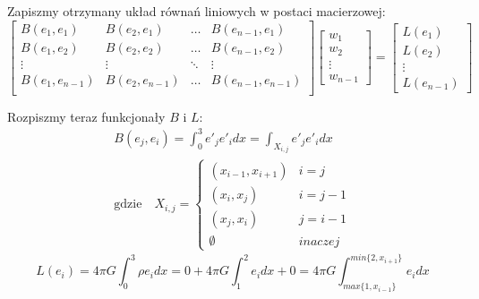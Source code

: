 \documentclass[11pt,a4paper]{article}
\begin{document}
Zapiszmy otrzymany układ równań liniowych w postaci macierzowej:
\begin{equation}
    \begin{bmatrix}
        B(e_1, e_1) & B(e_2, e_1) & \dots & B(e_{n - 1}, e_1) \\
        B(e_1, e_2) & B(e_2, e_2) & \dots & B(e_{n - 1}, e_2) \\
        \vdots & \vdots & \ddots & \vdots \\
        B(e_1, e_{n - 1}) & B(e_2, e_{n - 1}) & \dots & B(e_{n - 1}, e_{n - 1}) \\
    \end{bmatrix}
    \begin{bmatrix}
        w_1 \\ w_2 \\ \vdots \\ w_{n - 1}
    \end{bmatrix}
    =
    \begin{bmatrix}
        L(e_1) \\ L(e_2) \\ \vdots \\ L(e_{n - 1})
    \end{bmatrix}
\end{equation}

Rozpiszmy teraz funkcjonały $B$ i $L$:
\begin{equation}
    \begin{split}
        B(e_j, e_i) = \int_{0}^{3} e'_j e'_i dx = \int_{X_{i,j}} e'_j e'_i dx\\
        \text{gdzie} \quad X_{i, j} = 
        \begin{cases}
            (x_{i - 1}, x_{i + 1}) & i = j \\
            (x_i, x_j) & i = j - 1 \\
            (x_j, x_i) & j = i - 1 \\
            \emptyset & inaczej
        \end{cases}
    \end{split}
\end{equation}
\begin{equation}
    L(e_i) = 4\pi G \int_{0}^{3}\rho e_i dx 
    = 0 + 4\pi G \int_{1}^{2} e_i dx + 0
    = 4\pi G \int_{max\{1, x_{i - 1}\}}^{min\{2, x_{i + 1}\}} e_i dx
\end{equation}
\end{document}

